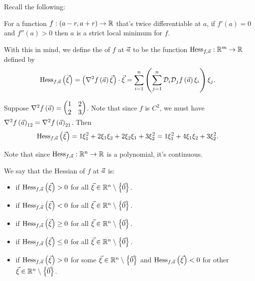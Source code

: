 \documentclass[main.tex]{subfiles}
\begin{document}
Recall the following:
\begin{lemma}
    For a function $f : (a - r, a + r) \to \mathbb R$ that's twice differentiable at $a$, if $f'(a) = 0$ and $f''(a) > 0$ then $a$ is a strict local minimum for $f$.
\end{lemma}
With this in mind, we define the  of $f$ at $\vec{a}$ to be the function $\operatorname{Hess}_{f, \vec{a}} : \mathbb R^m \to \mathbb R$ defined by
\[\operatorname{Hess}_{f, \vec{a}}\left( \vec\xi \right) = \left( \nabla^2 f\left( \vec{a} \right) \vec\xi \right)\cdot \vec\xi = \sum_{i = 1}^n \left( \sum_{j = 1}^n \mathcal{D}_i\mathcal{D}_jf\left( \vec{a} \right)\xi_i \right)\xi_j.\]

\begin{example}
    Suppose $\nabla^2f\left( \vec{a} \right) = \begin{pmatrix}
        1 & 2 \\
        2 & 3
    \end{pmatrix}$. Note that since $f$ is $C^2$, we must have $\nabla^2f\left( \vec{a} \right)_{12} = \nabla^2f\left( \vec{a} \right)_{21}$. Then
    \[\operatorname{Hess}_{f, \vec{a}}\left( \vec\xi \right) = 1\xi_1^2 + 2\xi_1\xi_2 + 2\xi_2\xi_1 + 3\xi_2^2 = 1\xi_1^2 + 4\xi_1\xi_2 + 3\xi_2^2.\]
\end{example}

\begin{remark}
    Note that since $\operatorname{Hess}_{f, \vec{a}} : \mathbb R^n \to \mathbb R$ is a polynomial, it's continuous.
\end{remark}

\begin{definition}
    We say that the Hessian of $f$ at $\vec{a}$ is:
    \begin{itemize}
        \item {} if $\operatorname{Hess}_{f, \vec{a}}\left( \vec\xi \right) > 0$ for all $\vec\xi \in \mathbb R^n\setminus\left\{ \vec{0} \right\}$.
        \item {} if $\operatorname{Hess}_{f, \vec{a}}\left( \vec\xi \right) < 0$ for all $\vec\xi \in \mathbb R^n\setminus\left\{ \vec{0} \right\}$.
        \item {} if $\operatorname{Hess}_{f, \vec{a}}\left( \vec\xi \right) \ge 0$ for all $\vec\xi \in \mathbb R^n\setminus\left\{ \vec{0} \right\}$.
        \item {} if $\operatorname{Hess}_{f, \vec{a}}\left( \vec\xi \right) \le 0$ for all $\vec\xi \in \mathbb R^n\setminus\left\{ \vec{0} \right\}$.
        \item {} if $\operatorname{Hess}_{f, \vec{a}}\left( \vec\xi \right) > 0$ for some $\vec\xi \in \mathbb R^n\setminus\left\{ \vec{0} \right\}$ and $\operatorname{Hess}_{f, \vec{a}}\left( \vec\xi \right) < 0$ for other $\vec\xi \in \mathbb R^n\setminus\left\{ \vec{0} \right\}$.
    \end{itemize}
\end{definition}
\end{document}
